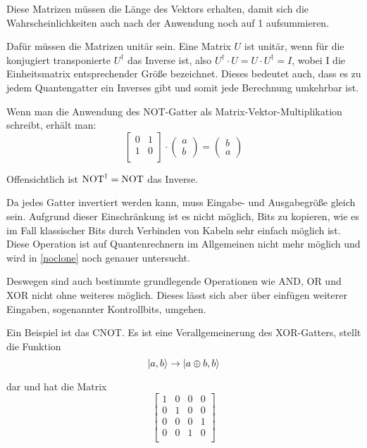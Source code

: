 \documentclass{acm_proc_article-sp}
\begin{document}
Diese Matrizen müssen die Länge des Vektors erhalten, damit sich die Wahrscheinlichkeiten auch nach der Anwendung 
noch auf 1 aufsummieren.

Dafür müssen die Matrizen unitär sein. Eine Matrix $U$ ist unitär, wenn für die konjugiert transponierte $U^{\dagger}$ das
Inverse ist, also $U^\dagger \cdot U = U \cdot U^\dagger = I$, wobei I die Einheitsmatrix entsprechender Größe bezeichnet.
Dieses bedeutet auch, dass es zu jedem Quantengatter ein Inverses gibt und somit jede Berechnung umkehrbar ist.

Wenn man die Anwendung des NOT-Gatter als Matrix-Vektor-Multiplikation schreibt, erhält man:
\[
\begin{bmatrix}
    0 & 1 \\
    1 & 0 \\
\end{bmatrix} \cdot 
\begin{pmatrix}
    a \\ b
\end{pmatrix} = 
\begin{pmatrix}
    b \\ a
\end{pmatrix} 
\]

Offensichtlich ist $\operatorname{NOT}^\dagger = \operatorname{NOT}$ das Inverse.

Da jedes Gatter invertiert werden kann, muss Eingabe- und Ausgabegröße gleich sein. 
Aufgrund dieser Einschränkung ist es nicht möglich, Bits zu kopieren, wie es im Fall klassischer Bits durch 
Verbinden von Kabeln sehr einfach möglich ist. 
Diese Operation ist auf Quantenrechnern im Allgemeinen nicht mehr möglich und wird in 
\ref{noclone} noch genauer untersucht.

Deswegen sind auch bestimmte grundlegende Operationen wie AND, OR und XOR nicht ohne weiteres möglich. 
Dieses lässt sich aber über einfügen weiterer Eingaben, sogenannter Kontrollbits, umgehen.

Ein Beispiel ist das CNOT. Es ist eine Verallgemeinerung des XOR-Gatters, stellt die Funktion
\[
    \left|a, b\right\rangle \rightarrow \left|a \oplus b, b\right\rangle
\]

dar und hat die Matrix
\[
\begin{bmatrix}
    1 & 0 & 0 & 0 \\
    0 & 1 & 0 & 0 \\
    0 & 0 & 0 & 1 \\
    0 & 0 & 1 & 0 \\
\end{bmatrix} 
\]
\end{document}

